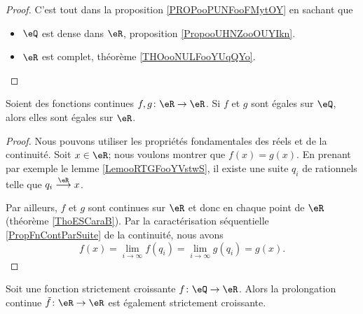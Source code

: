 \begin{proof}
	C'est tout dans la proposition \ref{PROPooPUNFooFMytOY} en sachant que
	\begin{itemize}
		\item \( \eQ\) est dense dans \( \eR\), proposition \ref{PropooUHNZooOUYIkn}.
		\item   \( \eR\) est complet, théorème \ref{THOooNULFooYUqQYo}.
	\end{itemize}
\end{proof}

\begin{proposition}     \label{PROPooXWHYooFiVYfi}
	Soient des fonctions continues \( f,g\colon \eR\to \eR\). Si \( f\) et \( g\) sont égales sur \( \eQ\), alors elles sont égales sur \( \eR\).
\end{proposition}

\begin{proof}
	Nous pouvons utiliser les propriétés fondamentales des réels et de la continuité. Soit \( x\in \eR\); nous voulons montrer que \( f(x)=g(x)\). En prenant par exemple le lemme \ref{LemooRTGFooYVstwS}, il existe une suite \( q_i\) de rationnels telle que \( q_i\stackrel{\eR}{\longrightarrow}x\).

	Par ailleurs, \( f\) et \( g\) sont continues sur \( \eR\) et donc en chaque point de \( \eR\) (théorème \ref{ThoESCaraB}). Par la caractérisation séquentielle \ref{PropFnContParSuite} de la continuité, nous avons
	\begin{equation}
		f(x)=\lim_{i\to \infty} f(q_i)=\lim_{i\to \infty} g(q_i)=g(x).
	\end{equation}
\end{proof}

\begin{proposition}      \label{PROPooTNIAooNAJDzL}
	Soit une fonction strictement croissante \( f\colon \eQ\to \eR\). Alors la prolongation continue \( \tilde f\colon \eR\to \eR\) est également strictement croissante.
\end{proposition}

